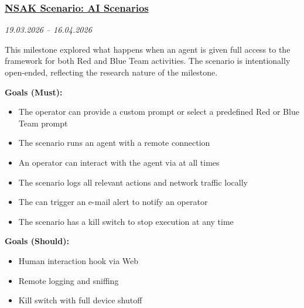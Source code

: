 \subsubsection{\href{https://gitlab.ti.bfh.ch/groups/gausf1-vonal3/-/milestones/18}{NSAK Scenario: AI Scenarios}}\label{subsubsec:milestone-ai-scenarios}
\textit{19.03.2026 -- 16.04.2026}

This milestone explored what happens when an  agent is given full access to the  framework for both Red and Blue Team activities.
The scenario is intentionally open-ended, reflecting the research nature of the milestone.

\textbf{Goals (Must):}
\begin{itemize}
    \item[$\checkmark$] The operator can provide a custom prompt or select a predefined Red or Blue Team prompt
    \item[$\checkmark$] The scenario runs an  agent with a remote connection
    \item[$\checkmark$] An operator can interact with the agent via  at all times
    \item[$\checkmark$] The scenario logs all relevant actions and network traffic locally
    \item[$\checkmark$] The  can trigger an e-mail alert to notify an operator
    \item[$\checkmark$] The scenario has a kill switch to stop execution at any time
\end{itemize}

\textbf{Goals (Should):}
\begin{itemize}
    \item[$\square$] Human interaction hook via Web 
    \item[$\square$] Remote logging and sniffing
    \item[$\square$] Kill switch with full device shutoff
\end{itemize}
